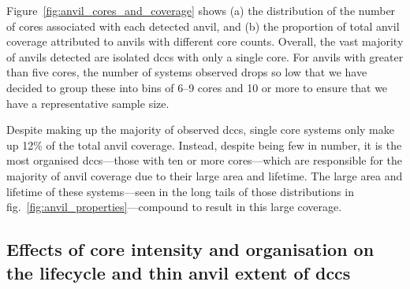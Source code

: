Figure~\ref{fig:anvil_cores_and_coverage} shows (a) the distribution of the number of cores associated with each detected anvil, and (b) the proportion of total anvil coverage attributed to anvils with different core counts.
Overall, the vast majority of anvils detected are isolated \acrshort{dcc}s with only a single core.
For anvils with greater than five cores, the number of systems observed drops so low that we have decided to group these into bins of 6--9 cores and 10 or more to ensure that we have a representative sample size.

Despite making up the majority of observed \acrshort{dcc}s, single core systems only make up 12\% of the total anvil coverage.
Instead, despite being few in number, it is the most organised \acrshort{dcc}s---those with ten or more cores---which are responsible for the majority of anvil coverage due to their large area and lifetime.
The large area and lifetime of these systems---seen in the long tails of those distributions in fig.~\ref{fig:anvil_properties}---compound to result in this large coverage.

\subsection{Effects of core intensity and organisation on the lifecycle and thin anvil extent of \acrshort{dcc}s}



